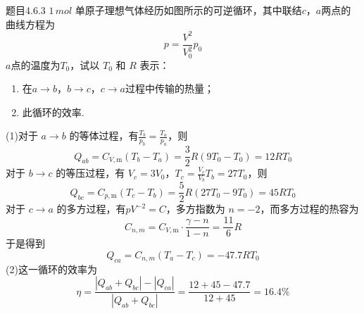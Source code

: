 \begin{question}{题目4.6.3}
    $1\,\si{mol}$ 单原子理想气体经历如图所示的可逆循环，其中联结$c$，$a$两点的曲线方程为
    $$
        p=\frac{V^2}{V_0^2}p_0
    $$
    $a$点的温度为$T_0$，试以 $T_0$ 和 $R$ 表示：
    \begin{enumerate}
        \item [(1)] 在$a \to b$，$b \to c$，$c \to a$过程中传输的热量；
        \item [(2)] 此循环的效率.
    \end{enumerate}
    \begin{center}
    \end{center}
\end{question}
\begin{solution}
    (1)对于 $a \to b$ 的等体过程，有$\frac{T_b}{p_b} = \frac{T_a}{p_a}$，则
    $$
        Q_{ab} = C_{V,\mathrm{m}}(T_b - T_a) = \frac{3}{2}R(9T_0 - T_0) = 12RT_0
    $$
    对于 $b \to c$ 的等压过程，有 $V_c = 3V_0$，$T_c = \frac{V_c}{V_b}T_b = 27T_0$，则
    $$
        Q_{bc} = C_{p,\mathrm{m}}(T_c - T_b) = \frac{5}{2}R(27T_0 - 9T_0) = 45RT_0
    $$
    对于 $c \to a$ 的多方过程，有$pV^{-2} = C$，多方指数为 $n=-2$，而多方过程的热容为
    $$
        C_{n,m} = C_{V,\mathrm{m}} \cdot \frac{\gamma - n}{1 - n} = \frac{11}{6}R
    $$
    于是得到
    $$
        Q_{ca} = C_{n,m}(T_a - T_c) = -47.7RT_0
    $$
    (2)这一循环的效率为
    $$
        \eta
        = \frac{|Q_{ab} + Q_{bc}| - |Q_{ca}|}{|Q_{ab} + Q_{bc}|}
        = \frac{12+45-47.7}{12+45}
        = 16.4\%
    $$
\end{solution}

